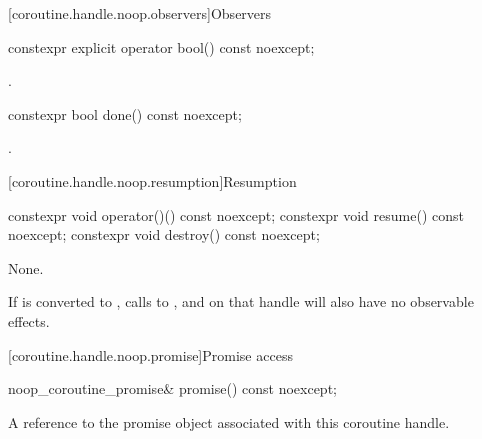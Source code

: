 [coroutine.handle.noop.observers]{Observers}

%
\begin{itemdecl}
constexpr explicit operator bool() const noexcept;
\end{itemdecl}

\begin{itemdescr}
\pnum \returns {}.
\end{itemdescr}

%
\begin{itemdecl}
constexpr bool done() const noexcept;
\end{itemdecl}

\begin{itemdescr}
\pnum \returns {}.
\end{itemdescr}

[coroutine.handle.noop.resumption]{Resumption}

%
%
%
\begin{itemdecl}
constexpr void operator()() const noexcept;
constexpr void resume() const noexcept;
constexpr void destroy() const noexcept;
\end{itemdecl}

\begin{itemdescr}
\pnum \effects None.

\pnum
\remarks
If  is converted to ,
calls to ,  and  on that handle
will also have no observable effects.
\end{itemdescr}

[coroutine.handle.noop.promise]{Promise access}

%
\begin{itemdecl}
noop_coroutine_promise& promise() const noexcept;
\end{itemdecl}

\begin{itemdescr}
\pnum \returns A reference to the promise object associated with this
coroutine handle.
\end{itemdescr}

